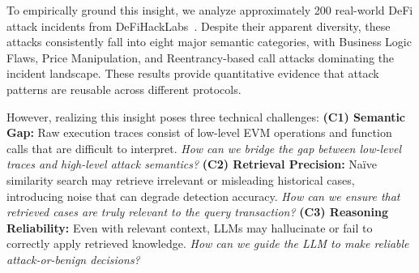 To empirically ground this insight, we analyze approximately 200 real-world DeFi attack incidents from DeFiHackLabs~\cite{defihacklabs2024}.
Despite their apparent diversity, these attacks consistently fall into eight major semantic categories, with Business Logic Flaws, Price Manipulation, and Reentrancy-based call attacks dominating the incident landscape.
These results provide quantitative evidence that attack patterns are reusable across different protocols.

However, realizing this insight poses three technical challenges: \textbf{(C1) Semantic Gap:} Raw execution traces consist of low-level EVM operations and function calls that are difficult to interpret. \textit{How can we bridge the gap between low-level traces and high-level attack semantics?} \textbf{(C2) Retrieval Precision:} Na\"ive similarity search may retrieve irrelevant or misleading historical cases, introducing noise that can degrade detection accuracy. \textit{How can we ensure that retrieved cases are truly relevant to the query transaction?} \textbf{(C3) Reasoning Reliability:} Even with relevant context, LLMs may hallucinate or fail to correctly apply retrieved knowledge. \textit{How can we guide the LLM to make reliable attack-or-benign decisions?}

